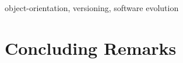 \documentclass[english,preprint,JIP]{ipsj}
\begin{document}
\begin{keyword}
object-orientation, versioning, software evolution
\end{keyword}

\maketitle















\newpage%

\section{Concluding Remarks}

\begin{acknowledgment}

\end{acknowledgment}



\begin{biography}
%
%
%
\end{biography}
\end{document}
